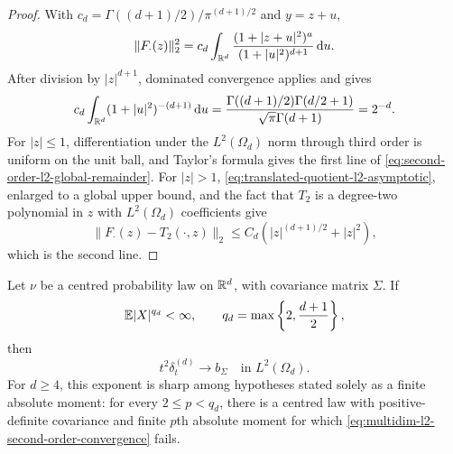 \begin{proof}
With \(c_d=\Gamma((d+1)/2)/\pi^{(d+1)/2}\) and \(y=z+u\),
\[
 \|F_\cdot(z)\|_2^2
 =c_d\int_{\mathbb{R}^d}
 \frac{(1+|z+u|^2)^a}{(1+|u|^2)^{d+1}}\,\mathrm{d} u.
\]
After division by \(|z|^{d+1}\), dominated convergence applies and gives
\[
 c_d\int_{\mathbb{R}^d}(1+|u|^2)^{-(d+1)}\,\mathrm{d} u
 =\frac{\Gamma((d+1)/2)\Gamma(d/2+1)}
 {\sqrt\pi\Gamma(d+1)}=2^{-d}.
\]
For \(|z|\le1\), differentiation under the \(L^2(\Omega_d)\) norm through
third order is uniform on the unit ball, and Taylor's formula gives the
first line of \eqref{eq:second-order-l2-global-remainder}.  For \(|z|>1\),
\eqref{eq:translated-quotient-l2-asymptotic}, enlarged to a global upper
bound, and the fact that \(T_2\) is a degree-two polynomial in \(z\) with
\(L^2(\Omega_d)\) coefficients give
\[
 \|F_\cdot(z)-T_2(\cdot,z)\|_2
 \le C_d(|z|^{(d+1)/2}+|z|^2),
\]
which is the second line.
\end{proof}

\begin{theorem}
\label{thm:multidim-l2-moment-threshold}
Let \(\nu\) be a centred probability law on \(\mathbb{R}^d\), with covariance
matrix \(\Sigma\).  If
\begin{equation}\label{eq:multidim-qd-moment}
 \mathbb{E}|X|^{q_d}<\infty,
 \qquad q_d=\max\left\{2,\frac{d+1}{2}\right\},
\end{equation}
then
\begin{equation}\label{eq:multidim-l2-second-order-convergence}
 t^2\delta_t^{(d)}\longrightarrow b_\Sigma
 \quad\text{in }L^2(\Omega_d).
\end{equation}
For \(d\ge4\), this exponent is sharp among hypotheses stated solely as a
finite absolute moment: for every \(2\le p<q_d\), there is a centred law
with positive-definite covariance and finite \(p\)th absolute moment for
which \eqref{eq:multidim-l2-second-order-convergence} fails.
\end{theorem}

